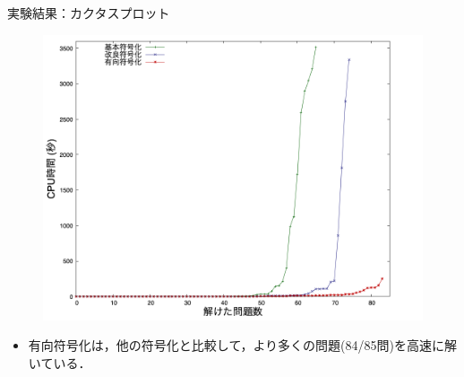 \documentclass[dvipdfmx,11pt]{beamer}
\begin{document}
\begin{frame}{実験結果：カクタスプロット}
 \begin{figure}[h]
  \centering
  \includegraphics[scale=0.25]{fig/cactus_hq.png}
 \end{figure}

\begin{itemize}
 \item 有向符号化は，他の符号化と比較して，より多くの問題(84/85問)を高速に解いている．
\end{itemize}\vfill
\end{frame}
\begin{frame}{~}
 \LARGE \centering
\end{frame}
%
\end{document}
